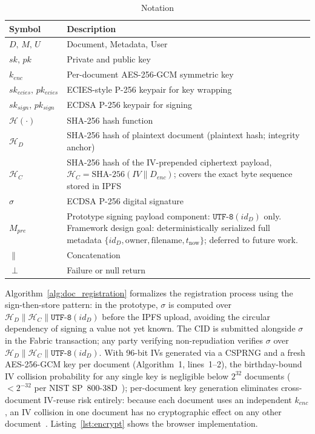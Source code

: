 \documentclass{ieeeaccess}
\begin{document}
\begin{table}[ht]
    \caption{Notation}
    \centering
    \renewcommand{\arraystretch}{1.3}
    \begin{tabularx}{\columnwidth}{@{} p{2.2cm}
                                       >{\raggedright\arraybackslash}X @{}}
        \toprule
        \textbf{Symbol} & \textbf{Description} \\
        \midrule
        $D,\,M,\,U$ & Document, Metadata, User \\
        $sk,\,pk$ & Private and public key \\
        $k_{enc}$ & Per-document AES-256-GCM symmetric key \\
        $sk_{ecies},\,pk_{ecies}$ & ECIES-style P-256 keypair for key wrapping \\
        $sk_{sign},\,pk_{sign}$ & ECDSA P-256 keypair for signing \\
        $\mathcal{H}(\cdot)$ & SHA-256 hash function \\
        $\mathcal{H}_D$ & SHA-256 hash of plaintext
        document (plaintext hash; integrity anchor) \\
        $\mathcal{H}_C$ &
        SHA-256 hash of the IV-prepended ciphertext payload,
        $\mathcal{H}_C = \text{SHA-256}(IV \| D_{enc})$;
        covers the exact byte sequence stored in IPFS \\
        $\sigma$ & ECDSA P-256 digital signature \\
        $M_{pre}$ & Prototype signing payload component:
        $\texttt{UTF-8}(id_D)$ only. Framework design goal:
        deterministically serialized full metadata
        $\{id_D, \text{owner}, \text{filename}, t_{\text{now}}\}$;
        deferred to future work. \\
        $\|$ & Concatenation \\
        $\perp$ & Failure or null return \\
        \bottomrule
    \end{tabularx}
\end{table}

Algorithm~\ref{alg:doc_registration} formalizes the registration
process using the sign-then-store pattern: in the prototype, $\sigma$ is
computed over $\mathcal{H}_D \| \mathcal{H}_C \| \texttt{UTF-8}(id_D)$
before the IPFS upload, avoiding the circular dependency of signing a
value not yet known. The CID is submitted alongside $\sigma$ in the Fabric
transaction; any party verifying non-repudiation verifies $\sigma$ over
$\mathcal{H}_D \| \mathcal{H}_C \| \texttt{UTF-8}(id_D)$. With 96-bit IVs generated via a
CSPRNG and a fresh AES-256-GCM key per document (Algorithm~1,
lines~1--2), the birthday-bound IV collision probability for any
single key is negligible below $2^{32}$ documents
($<2^{-32}$ per NIST SP~800-38D~\cite{nist80038d}); per-document
key generation eliminates cross-document IV-reuse risk entirely: because
each document uses an independent $k_{enc}$, an IV collision in one
document has no cryptographic effect on any other document~\cite{nist80038d}.
Listing~\ref{lst:encrypt} shows the browser implementation.
\end{document}
